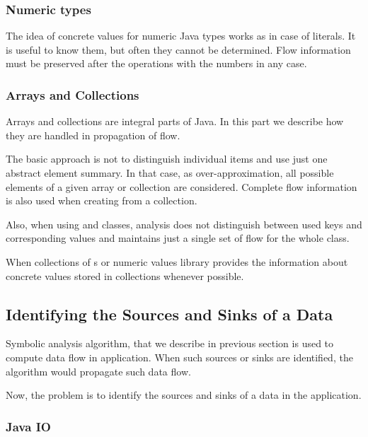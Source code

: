 \subsubsection{Numeric types}

The idea of concrete values for numeric Java types works as in case
of  literals. It is useful to know them, but often
they cannot be determined. Flow information must be preserved after
the operations with the numbers in any case.




\subsubsection{Arrays and Collections}

Arrays and collections are integral parts of Java. In this part we describe how
they are handled in propagation of flow.

The basic approach is not to distinguish individual items and use just one
abstract element summary. In that case, as over-approximation, all possible elements
of a given array or collection are considered.
Complete flow information is also used when creating 
from a collection.

Also, when using  and  classes,
analysis does not distinguish between used keys and corresponding values
and maintains just a single set of flow for the whole class.

When collections of s or numeric values library provides
the information about concrete values stored in collections whenever possible.





\subsection{Identifying the Sources and Sinks of a Data}

Symbolic analysis algorithm, that we describe in previous section is
used to compute data flow in application.
When such sources or sinks are identified, the algorithm would
propagate such data flow.

Now, the problem is to identify the sources and sinks of a data
in the application.




\subsubsection{Java IO}

